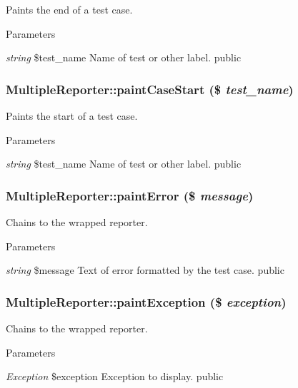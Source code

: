 Paints the end of a test case. 
\begin{DoxyParams}{Parameters}
\item[{\em string}]\$test\_\-name Name of test or other label.  public \end{DoxyParams}
\hypertarget{class_multiple_reporter_af4b1f80776530199cd91419c758c3d68}{
\subsubsection[{paintCaseStart}]{\setlength{\rightskip}{0pt plus 5cm}MultipleReporter::paintCaseStart (\$ {\em test\_\-name})}}
\label{class_multiple_reporter_af4b1f80776530199cd91419c758c3d68}
Paints the start of a test case. 
\begin{DoxyParams}{Parameters}
\item[{\em string}]\$test\_\-name Name of test or other label.  public \end{DoxyParams}
\hypertarget{class_multiple_reporter_aa97458bc8253435cb306fbcfd0d9700c}{
\subsubsection[{paintError}]{\setlength{\rightskip}{0pt plus 5cm}MultipleReporter::paintError (\$ {\em message})}}
\label{class_multiple_reporter_aa97458bc8253435cb306fbcfd0d9700c}
Chains to the wrapped reporter. 
\begin{DoxyParams}{Parameters}
\item[{\em string}]\$message Text of error formatted by the test case.  public \end{DoxyParams}
\hypertarget{class_multiple_reporter_abb9aa4a74a8689c05cbd0535d276f907}{
\subsubsection[{paintException}]{\setlength{\rightskip}{0pt plus 5cm}MultipleReporter::paintException (\$ {\em exception})}}
\label{class_multiple_reporter_abb9aa4a74a8689c05cbd0535d276f907}
Chains to the wrapped reporter. 
\begin{DoxyParams}{Parameters}
\item[{\em Exception}]\$exception Exception to display.  public \end{DoxyParams}
